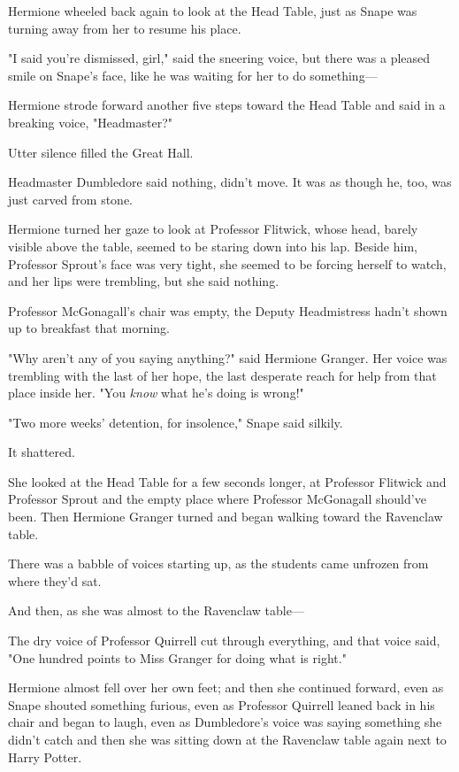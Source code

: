 Hermione wheeled back again to look at the Head Table, just as Snape was
turning away from her to resume his place.

"I said you're dismissed, girl," said the sneering voice, but there was a
pleased smile on Snape's face, like he was waiting for her to do something---

Hermione strode forward another five steps toward the Head Table and said in a
breaking voice, "Headmaster?"

Utter silence filled the Great Hall.

Headmaster Dumbledore said nothing, didn't move. It was as though he, too, was
just carved from stone.

Hermione turned her gaze to look at Professor Flitwick, whose head, barely
visible above the table, seemed to be staring down into his lap. Beside him,
Professor Sprout's face was very tight, she seemed to be forcing herself to
watch, and her lips were trembling, but she said nothing.

Professor McGonagall's chair was empty, the Deputy Headmistress hadn't shown up
to breakfast that morning.

"Why aren't any of you saying anything?" said Hermione Granger. Her voice was
trembling with the last of her hope, the last desperate reach for help from
that place inside her. "You \emph{know} what he's doing is wrong!"

"Two more weeks' detention, for insolence," Snape said silkily.

It shattered.

She looked at the Head Table for a few seconds longer, at Professor Flitwick
and Professor Sprout and the empty place where Professor McGonagall should've
been. Then Hermione Granger turned and began walking toward the Ravenclaw table.

There was a babble of voices starting up, as the students came unfrozen from
where they'd sat.

And then, as she was almost to the Ravenclaw table---

The dry voice of Professor Quirrell cut through everything, and that voice
said, "One hundred points to Miss Granger for doing what is right."

Hermione almost fell over her own feet; and then she continued forward, even as
Snape shouted something furious, even as Professor Quirrell leaned back in his
chair and began to laugh, even as Dumbledore's voice was saying something she
didn't catch and then she was sitting down at the Ravenclaw table again next to
Harry Potter.

